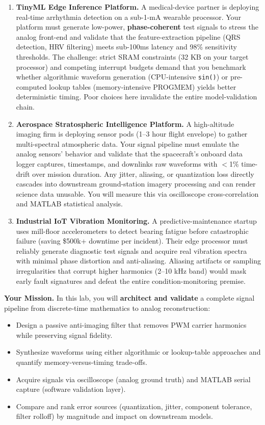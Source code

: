 \documentclass[11pt,letterpaper]{article}
\begin{document}
\begin{enumerate}[leftmargin=0.4in]
    \item \textbf{TinyML Edge Inference Platform.} A medical-device partner is deploying real-time arrhythmia detection on a sub-1-mA wearable processor. Your platform must generate low-power, \textbf{phase-coherent} test signals to stress the analog front-end and validate that the feature-extraction pipeline (QRS detection, HRV filtering) meets sub-100ms latency and 98\% sensitivity thresholds. The challenge: strict SRAM constraints (32 KB on your target processor) and competing interrupt budgets demand that you benchmark whether algorithmic waveform generation (CPU-intensive \texttt{sin()}) or pre-computed lookup tables (memory-intensive PROGMEM) yields better deterministic timing. Poor choices here invalidate the entire model-validation chain.

    \item \textbf{Aerospace Stratospheric Intelligence Platform.} A high-altitude imaging firm is deploying sensor pods (1--3 hour flight envelope) to gather multi-spectral atmospheric data. Your signal pipeline must emulate the analog sensors' behavior and validate that the spacecraft's onboard data logger captures, timestamps, and downlinks raw waveforms with $<$1\% time-drift over mission duration. Any jitter, aliasing, or quantization loss directly cascades into downstream ground-station imagery processing and can render science data unusable. You will measure this via oscilloscope cross-correlation and MATLAB statistical analysis.

    \item \textbf{Industrial IoT Vibration Monitoring.} A predictive-maintenance startup uses mill-floor accelerometers to detect bearing fatigue before catastrophic failure (saving \$500k+ downtime per incident). Their edge processor must reliably generate diagnostic test signals and acquire real vibration spectra with minimal phase distortion and anti-aliasing. Aliasing artifacts or sampling irregularities that corrupt higher harmonics (2--10 kHz band) would mask early fault signatures and defeat the entire condition-monitoring premise.
\end{enumerate}

\noindent
\textbf{Your Mission.} In this lab, you will \textbf{architect and validate} a complete signal pipeline from discrete-time mathematics to analog reconstruction:
\begin{itemize}
    \item Design a passive anti-imaging filter that removes PWM carrier harmonics while preserving signal fidelity.
    \item Synthesize waveforms using either algorithmic or lookup-table approaches and quantify memory-versus-timing trade-offs.
    \item Acquire signals via oscilloscope (analog ground truth) and MATLAB serial capture (software validation layer).
    \item Compare and rank error sources (quantization, jitter, component tolerance, filter rolloff) by magnitude and impact on downstream models.
\end{itemize}
\end{document}
